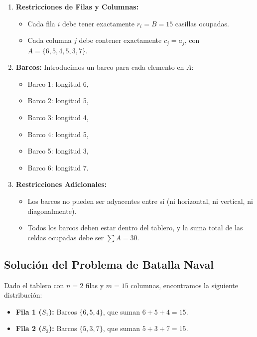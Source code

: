 \begin{enumerate}
    \item \textbf{Restricciones de Filas y Columnas:}
    \begin{itemize}
        \item Cada fila $i$ debe tener exactamente $r_i = B = 15$ casillas ocupadas.
        \item Cada columna $j$ debe contener exactamente $c_j = a_j$, con $A = \{6, 5, 4, 5, 3, 7\}$.
    \end{itemize}

    \item \textbf{Barcos:}
    Introducimos un barco para cada elemento en $A$:
    \begin{itemize}
        \item Barco 1: longitud 6,
        \item Barco 2: longitud 5,
        \item Barco 3: longitud 4,
        \item Barco 4: longitud 5,
        \item Barco 5: longitud 3,
        \item Barco 6: longitud 7.
    \end{itemize}

    \item \textbf{Restricciones Adicionales:}
    \begin{itemize}
        \item Los barcos no pueden ser adyacentes entre sí (ni horizontal, ni vertical, ni diagonalmente).
        \item Todos los barcos deben estar dentro del tablero, y la suma total de las celdas ocupadas debe ser $\sum A = 30$.
    \end{itemize}
\end{enumerate}

\subsection*{Solución del Problema de Batalla Naval}

Dado el tablero con $n = 2$ filas y $m = 15$ columnas, encontramos la siguiente distribución:

\begin{itemize}
    \item \textbf{Fila 1 ($S_1$):} Barcos $\{6, 5, 4\}$, que suman $6 + 5 + 4 = 15$.
    \item \textbf{Fila 2 ($S_2$):} Barcos $\{5, 3, 7\}$, que suman $5 + 3 + 7 = 15$.
\end{itemize}

